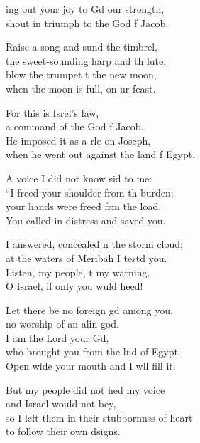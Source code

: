 \settowidth{\versewidth}{so I left them in their stubbornness of heart *}
\begin{psalmverse}%
  \begin{patverse}
ing out your joy to Gd our strength,\Med\\
shout in triumph to the God f Jacob.

Raise a song and sund the timbrel,\Med\\
the sweet-sounding harp and th lute;\\
blow the trumpet t the new moon,\Med\\
when the moon is full, on ur feast.

For this is Isrel’s law,\Med\\
a command of the God f Jacob.\\
He imposed it as a rle on Joseph,\Med\\
when he went out against the land f Egypt.

A voice I did not know sid to me:\Med\\
“I freed your shoulder from th burden;\\
your hands were freed frm the load.\Med\\
You called in distress and  saved you.

I answered, concealed \pointup{\i}n the storm cloud;\Med\\
at the waters of Meribah I testd you.\\
Listen, my people, t my warning.\Med\\
O Israel, if only you wuld heed!

Let there be no foreign gd among you.\Med\\
no worship of an alin god.\\
I am the Lord your Gd,\Flex\\
who brought you from the lnd of Egypt.\Med\\
Open wide your mouth and I w\pointup{\i}ll fill it.

But my people did not hed my voice\Med\\
and Israel would not bey,\\
so I left them in their stubbornnss of heart\Med\\
to follow their own dsigns.


\end{patverse}
\end{psalmverse}
